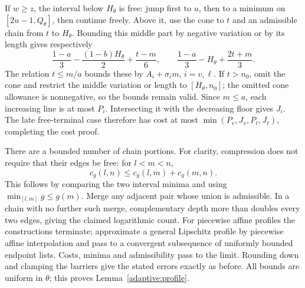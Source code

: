 If \(w\ge z\), the interval below \(H_\theta\) is free: jump first
to \(u\), then to a minimum on \([2u-1,Q_\theta]\), then continue
freely. Above it, use the cone to \(t\) and an admissible chain from
\(t\) to \(H_\theta\). Bounding this middle part by negative variation
or by its length gives respectively
\[
 \frac{1-a}{3}-\frac{(1-b)H_\theta}{2}+\frac{t-m}{6},
 \qquad
 \frac{1-a}{3}-H_\theta+\frac{2t+m}{3}.
\]
The relation \(t\le m/a\) bounds these by
\(A_i+\sigma_i m\), \(i=v,\ell\). If \(t>n_0\), omit the cone
and restrict the middle variation or length to \([H_\theta,n_0]\);
the omitted cone allowance is nonnegative, so the bounds remain valid.
Since \(m\le a\), each increasing line is at most \(P_i\).
Intersecting it with the decreasing floor gives \(J_i\). The late
free-terminal case therefore has cost at most
\(\min(P_v,J_v,P_\ell,J_\ell)\), completing the cost proof.

There are a bounded number of chain portions. For clarity, compression
does not require that their edges be free: for \(l<m<n\),
\[
 c_g(l,n)\le c_g(l,m)+c_g(m,n).
\]
This follows by comparing the two interval minima and using
\(\min_{[l,m]}g\le g(m)\). Merge any adjacent pair whose union is
admissible. In a chain with no further such merge, complementary depth
more than doubles every two edges, giving the claimed logarithmic count.
For piecewise affine profiles the constructions terminate; approximate
a general Lipschitz profile by piecewise affine interpolation and pass to
a convergent subsequence of uniformly bounded endpoint lists. Costs,
minima and admissibility pass to the limit. Rounding down and clamping
the barriers give the stated errors exactly as before. All bounds are
uniform in \(\theta\); this proves Lemma~\ref{adaptive:profile}.


